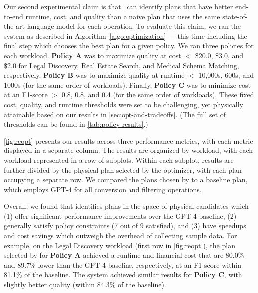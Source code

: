 Our second experimental claim is that \system\ can identify plans that have better end-to-end runtime, cost, and quality than a naive plan that uses the same state-of-the-art language model for each operation. To evaluate this claim, we ran the system as described in Algorithm~\ref{algo:optimization} --- this time including the final step which chooses the best plan for a given policy. We ran three policies for each workload. {\bf Policy A} was to maximize quality at cost $<$ \$20.0, \$3.0, and \$2.0 for Legal Discovery, Real Estate Search, and Medical Schema Matching, respectively. {\bf Policy B} was to maximize quality at runtime $<$ 10,000s, 600s, and 1000s (for the same order of workloads). Finally, {\bf Policy C} was to minimize cost at an F1-score $>$ 0.8, 0.8, and 0.4 (for the same order of workloads). These fixed cost, quality, and runtime thresholds were set to be challenging, yet physically attainable based on our results in \autoref{sec:opt-and-tradeoffs}. (The full set of thresholds can be found in \autoref{tab:policy-results}.)

\autoref{fig:reopt} presents our results across three performance metrics, with each metric displayed in a separate column. The results are organized by workload, with each workload represented in a row of subplots. Within each subplot, results are further divided by the physical plan selected by the optimizer, with each plan occupying a separate row. We compared the plans chosen by \system{} to a baseline plan, which employs GPT-4 for all conversion and filtering operations.

Overall, we found that \system{} identifies plans in the space of physical candidates which (1) offer significant performance improvements over the GPT-4 baseline, (2) generally satisfy policy constraints (7 out of 9 satisfied), and (3) have speedups and cost savings which outweigh the overhead of collecting sample data. For example, on the Legal Discovery workload (first row in \autoref{fig:reopt}), the plan selected by \system{} for {\bf Policy A} achieved a runtime and financial cost that are 80.0\% and 89.7\% lower than the GPT-4 baseline, respectively, at an F1-score within 81.1\% of the baseline. The system achieved similar results for {\bf Policy C}, with slightly better quality (within 84.3\% of the baseline).


